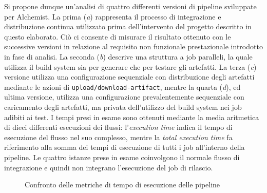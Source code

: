 Si propone dunque un'analisi di quattro differenti versioni di pipeline sviluppate per Alchemist. La prima (\textit{a}) rappresenta il processo di integrazione e distribuzione continua utilizzato prima dell'intervento del progetto descritto in questo elaborato. Ciò ci consente di misurare il risultato ottenuto con le successive versioni in relazione al requisito non funzionale prestazionale introdotto in fase di analisi. La seconda (\textit{b}) descrive una struttura a job paralleli, la quale utilizza il build system sia per generare che per testare gli artefatti. La terza (\textit{c}) versione utilizza una configurazione sequenziale con distribuzione degli artefatti mediante le azioni di \texttt{upload/download-artifact}, mentre la quarta (\textit{d}), ed ultima versione, utilizza una configurazione prevalentemente sequenziale con caricamento degli artefatti, ma privata dell'utilizzo del build system nei job adibiti ai test. I tempi presi in esame sono ottenuti mediante la media aritmetica di dieci differenti esecuzioni dei flussi: l'\textit{execution time} indica il tempo di esecuzione del flusso nel suo complesso, mentre la \textit{total execution time} fa riferimento alla somma dei tempi di esecuzione di tutti i job all'interno della pipeline. Le quattro istanze prese in esame coinvolgono il normale flusso di integrazione e quindi non integrano l'esecuzione del job di rilascio.

\begin{figure}[htb]
	\centering
	\caption{Confronto delle metriche di tempo di esecuzione delle pipeline}
	\label{fig:histogram}
\end{figure}
 
